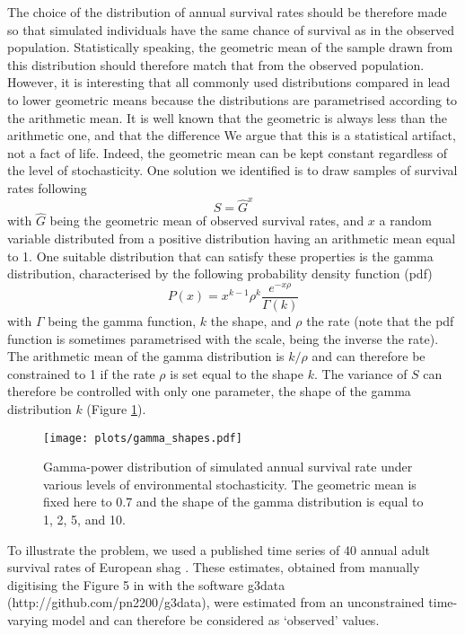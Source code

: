 \documentclass[preprint,authoryear,12pt]{elsarticle}
\begin{document}
The choice of the distribution of annual survival rates should be
therefore made so that simulated individuals have the same chance of
survival as in the observed population. Statistically speaking, the
geometric mean of the sample drawn from this distribution should
therefore match that from the observed population. However, it is
interesting that all commonly used distributions compared in
\citep{samaranayaka_modelling_2010} lead to lower geometric means
because the distributions are parametrised according to the arithmetic
mean. It is well known that the geometric is always less than the
arithmetic one, and that the difference We argue that this is a
statistical artifact, not a fact of life. Indeed, the geometric mean
can be kept constant regardless of the level of stochasticity. One
solution we identified is to draw samples of survival rates following
\[ S = \hat{G}^x \]
with $\hat{G}$ being the geometric mean of observed survival rates,
and $x$ a random variable distributed from a positive distribution
having an arithmetic mean equal to 1. One suitable distribution that
can satisfy these properties is the gamma distribution, characterised
by the following probability density function (pdf)
\[P(x) = x^{k-1}\rho^{k}\frac{e^{-x \rho}}{\Gamma(k)} \] 
with $\Gamma$ being the gamma function, $k$ the shape, and $\rho$ the
rate (note that the pdf function is sometimes parametrised with the
scale, being the inverse the rate). The arithmetic mean of the gamma
distribution is $k/\rho$ and can therefore be constrained to 1
if the rate $\rho$ is set equal to the shape $k$. The variance of $S$
can therefore be controlled with only one parameter, the shape of the
gamma distribution $k$ (Figure \ref{fig:gamma}). 


\begin{figure}[htbp]
\begin{center}
\texttt{[image: plots/gamma\_shapes.pdf]}
\end{center}
\caption{Gamma-power distribution of simulated annual survival rate under various
  levels of environmental stochasticity. The geometric mean is fixed
  here to 0.7 and the shape of the gamma distribution is equal to 1, 2, 5, and 10. }
\label{fig:gamma}
\end{figure}


To illustrate the problem, we used a published time series of 40 annual
adult survival rates of European shag \citep[\textit{Phalacrocorax
  aristotelis};][]{frederiksen_demographic_2008}. These estimates,
obtained from manually digitising the Figure 5 in
\citet{frederiksen_demographic_2008} with the software g3data
(http://github.com/pn2200/g3data), were estimated from an unconstrained
time-varying model and can therefore be considered as `observed'
values.
\end{document}
